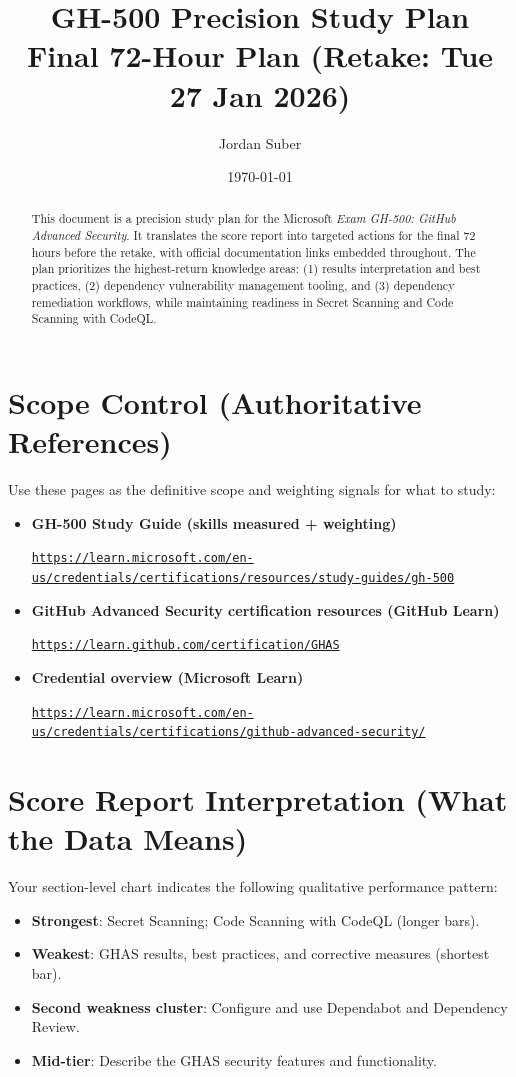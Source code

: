 \documentclass[11pt]{article}
\title{\textbf{GH-500 Precision Study Plan}\\
\large Final 72-Hour Plan (Retake: Tue 27 Jan 2026)}
\author{Jordan Suber}
\date{\today}
\newcommand{\DocLink}[2]{%
  \item \textbf{#1}\par
  \noindent\href{#2}{\nolinkurl{#2}}%
}
\begin{document}
\maketitle

\begin{abstract}
This document is a precision study plan for the Microsoft \emph{Exam GH-500: GitHub Advanced Security}.
It translates the score report into targeted actions for the final 72 hours before the retake, with official documentation links embedded throughout.
The plan prioritizes the highest-return knowledge areas: (1) results interpretation and best practices, (2) dependency vulnerability management tooling, and (3) dependency remediation workflows, while maintaining readiness in Secret Scanning and Code Scanning with CodeQL.
\end{abstract}

\section{Scope Control (Authoritative References)}
Use these pages as the definitive scope and weighting signals for what to study:

\begin{itemize}
  \DocLink{GH-500 Study Guide (skills measured + weighting)}{https://learn.microsoft.com/en-us/credentials/certifications/resources/study-guides/gh-500}
  \DocLink{GitHub Advanced Security certification resources (GitHub Learn)}{https://learn.github.com/certification/GHAS}
  \DocLink{Credential overview (Microsoft Learn)}{https://learn.microsoft.com/en-us/credentials/certifications/github-advanced-security/}
\end{itemize}

\section{Score Report Interpretation (What the Data Means)}
Your section-level chart indicates the following qualitative performance pattern:

\begin{itemize}
  \item \textbf{Strongest}: Secret Scanning; Code Scanning with CodeQL (longer bars).
  \item \textbf{Weakest}: GHAS results, best practices, and corrective measures (shortest bar).
  \item \textbf{Second weakness cluster}: Configure and use Dependabot and Dependency Review.
  \item \textbf{Mid-tier}: Describe the GHAS security features and functionality.
\end{itemize}
\end{document}
